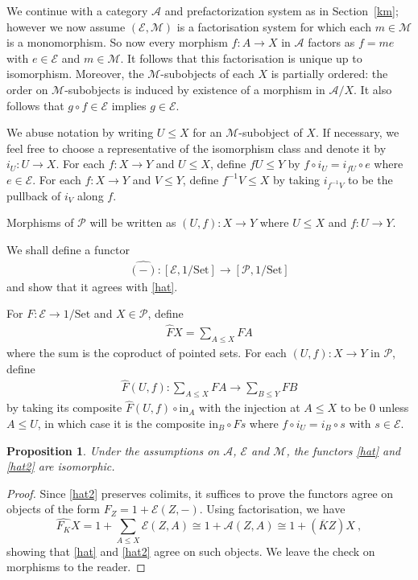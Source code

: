 \documentclass[a4paper,12pt,reqno]{amsart}
\newtheorem{proposition}[theorem]{Proposition}
\theoremstyle{definition}
\theoremstyle{fact}
\theoremstyle{genquest}
\theoremstyle{step}
\newcommand{\lra}{\longrightarrow}
\def\CA{{\mathscr A}}
\def\CE{{\mathscr E}}
\def\CM{{\mathscr M}}
\def\CP{{\mathscr P}}
\begin{document}
We continue with a category $\CA$ and prefactorization system as in Section~\ref{km}; 
however we now assume $(\CE,\CM)$ is a factorisation system \cite{FreydKelly} for 
which each $m\in \CM$ is a monomorphism. 
So now every morphism $f : A \lra X$ in $\CA$ factors as $f=me$ with
$e\in \CE$ and $m\in \CM$. It follows that this factorisation is unique up to
isomorphism. Moreover, the $\CM$-subobjects of each $X$ is partially ordered:
the order on $\CM$-subobjects is induced by existence of a morphism in $\CA/X$.
It also follows that $g\circ f \in \CE$ implies $g \in \CE$.

We abuse notation by writing $U\le X$ for an $\CM$-subobject of $X$. 
If necessary, we feel free to choose a representative of the isomorphism class and
denote it by $i_U : U \lra X$.
For each $f : X \lra Y$ and $U\le X$, define $fU \le Y$ by $f \circ i_U=i_{fU}\circ e$ where $e\in \CE$. 
For each $f : X \lra Y$ and $V\le Y$, define $f^{-1}V\le X$ by taking $i_{f^{-1}V}$ to
be the pullback of $i_V$ along $f$. 

Morphisms of $\CP$ will be written as $(U,f) : X \lra Y$
where $U\le X$ and $f:U\lra Y$. 

We shall define a functor
\begin{eqnarray}\label{hat2}
\widehat{(-)} : [\CE, 1/\mathrm{Set}] \lra [\CP, 1/\mathrm{Set}] 
\end{eqnarray}
and show that it agrees with \eqref{hat}.

For $F : \CE \lra 1/\mathrm{Set}$ and $X\in \CP$, define
\begin{eqnarray}\label{hatformula}
\widehat{F}X = \sum_{A\le X}{FA}
\end{eqnarray}
where the sum is the coproduct of pointed sets.
For each $(U,f) : X \lra Y$ in $\CP$, define
\begin{eqnarray}
\widehat{F}(U,f) : \sum_{A\le X}{FA} \lra \sum_{B\le Y}{FB} 
\end{eqnarray} 
by taking its composite $\widehat{F}(U,f) \circ \mathrm{in}_A$ with the injection
at $A\le X$ to be $0$ unless $A\le U$, in which case it is the
composite $\mathrm{in}_B \circ Fs$ where $f \circ i_U = i_B \circ s$ with $s\in \CE$. 

\begin{proposition} Under the assumptions on $\CA$, $\CE$ and $\CM$, the functors 
\eqref{hat} and \eqref{hat2} are isomorphic.
\end{proposition}
\begin{proof}
Since \eqref{hat2} preserves colimits, it suffices to prove the functors agree on
objects of the form $F_Z=1+ \CE(Z,-)$. 
Using factorisation, we have
$$\widehat{F_K}X =1+ \sum_{A\le X}{\CE(Z,A)} 
\cong 1 +\CA(Z,A) \cong 1 + (\overline{K}Z)X \ , 
$$
showing that \eqref{hat} and \eqref{hat2} agree on such objects. 
We leave the check on morphisms to the reader. 
\end{proof}
\end{document}
